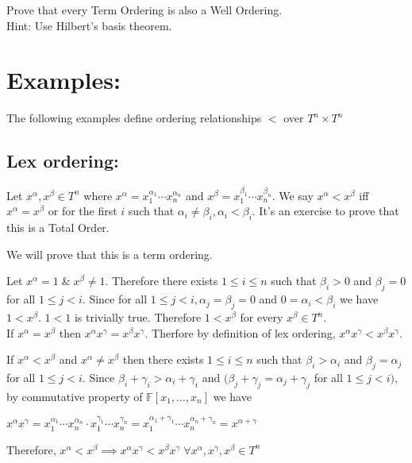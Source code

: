 \begin{exercise}
Prove that every Term Ordering is also a Well Ordering.\\
Hint: Use Hilbert's basis theorem.
\end{exercise}




\section*{Examples:}
The following examples define ordering relationships $<$ over $T^{n}\times T^{n}$
\subsection*{Lex ordering:}
Let $x^{\alpha},x^{\beta} \in T^{n}$ where
$x^{\alpha}=x_{1}^{\alpha_{1}}\cdots x_{n}^{\alpha_{n}}$ and $x^{\beta}=x_{1}^{\beta_{1}}\cdots x_{n}^{\beta_{n}}$. We say 
$x^{\alpha}<x^{\beta}$ iff $x^{\alpha}=x^{\beta}$ or for the first $i$ such that $\alpha_{i}\neq \beta_{i}, \alpha_{i}<\beta_{i}$.
It's an exercise to prove that this is a Total Order. 

We will prove that this is a term ordering.

Let $x^{\alpha}=1\;\&\;x^{\beta}\neq1$. Therefore
there exists $1\leq i\leq n$ such that $\beta_{i}>0$ and $\beta_{j}=0$ for all $1\leq j<i$. Since 
for all $1\leq j<i, \alpha_{j}=\beta_{j}=0$ and
$0=\alpha_{i}<\beta_{i}$ we have $1<x^{\beta}$.
$1<1$ is trivially true. Therefore
$1<x^{\beta}$ for every $x^{\beta}\in T^n$.\\


If $x^{\alpha}=x^{\beta}$ then $x^{\alpha}x^{\gamma}=x^{\beta}x^{\gamma}$. Therfore by definition of lex ordering, $x^{\alpha}x^{\gamma}<x^{\beta}x^{\gamma}$.

If $x^{\alpha}<x^{\beta}$ and $x^{\alpha}\neq x^{\beta}$ then there exists $1\leq i\leq n$ such that $\beta_{i}>\alpha_{i}$ and $\beta_{j}=\alpha_{j}$ for all $1\leq j<i$. Since $\beta_{i}+\gamma_{i}>\alpha_{i}+\gamma_{i}$ and $(\beta_{j}+\gamma_{j}=\alpha_{j}+\gamma_{j}$ for all $1\leq j<i)$, by commutative property of $\mathbb{F}[x_{1},\ldots,x_{n}]$ we have
\begin{center}
$x^{\alpha}x^{\gamma}=x_{1}^{\alpha_{1}}\cdots x_{n}^{\alpha_{n}}\cdot x_{1}^{\gamma_{1}}\cdots x_{n}^{\gamma_{n}}=x_{1}^{\alpha_{1}+\gamma_{1}}\cdots x_{n}^{\alpha_{n}+\gamma_{n}}=x^{\alpha+\gamma}$
\end{center}
Therefore,
$x^{\alpha}<x^{\beta}\implies x^{\alpha}x^{\gamma}<x^{\beta}x^{\gamma}\; \forall x^{\alpha},x^{\gamma},x^{\beta}\in T^{n}$


